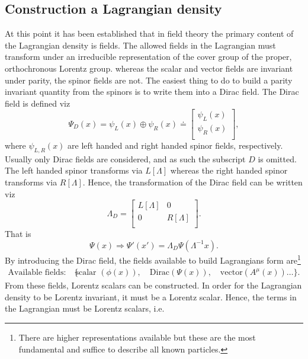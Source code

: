 \subsection{Construction a Lagrangian density}
At this point it has been established that in field theory the primary content of the Lagrangian density is fields. The allowed fields in the Lagrangian must transform under an irreducible representation of the cover group of the proper, orthochronous Lorentz group. whereas the scalar and vector fields are invariant under parity, the spinor fields are not. The easiest thing to do to build a parity invariant quantity from the spinors is to write them into a Dirac field. The Dirac field is defined viz
\begin{equation}
	\Psi_D(x)=\psi_L(x)\oplus\psi_R(x)\doteq\begin{bmatrix}
		\psi_L(x)\\
		\psi_R(x)\\
	\end{bmatrix},
\end{equation} 
where $\psi_{L,R}(x)$ are left handed and right handed spinor fields, respectively. Usually only Dirac fields are considered, and as such the subscript $D$ is omitted. The left handed spinor transforms via $L[\Lambda]$ whereas the right handed spinor transforms via $R[\Lambda]$. Hence, the transformation of the Dirac field can be written viz
\begin{equation}
	\Lambda_D=\begin{bmatrix}
		L[\Lambda] & 0 \\
		0 & R[\Lambda]\\
	\end{bmatrix}.
\end{equation} 
That is
\begin{equation}
	\Psi(x)\Rightarrow \Psi'(x')=\Lambda_D\Psi(\Lambda^{-1}x).
\end{equation} 
By introducing the Dirac field, the fields available to build Lagrangians form are\footnote{There are higher representations available but these are the most fundamental and suffice to describe all known particles.}
\begin{equation}
	\begin{split}
		\text{Available fields:} \quad \{&\text{scalar } (\phi(x)), \quad \text{Dirac} (\Psi(x)), \quad \text{vector} (A^\mu(x))\dots\}.
	\end{split}
\end{equation} 
From these fields, Lorentz scalars can be constructed. In order for the Lagrangian density to be Lorentz invariant, it must be a Lorentz scalar. Hence, the terms in the Lagrangian must be Lorentz scalars, i.e.
